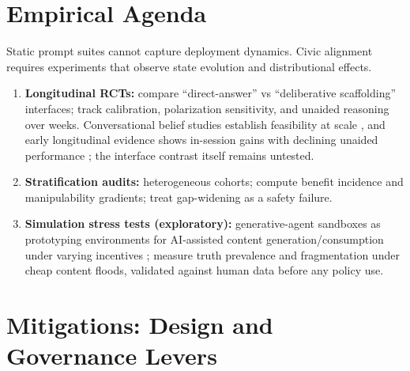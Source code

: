 \documentclass[11pt]{article}
\theoremstyle{definition}
\theoremstyle{remark}
\numberwithin{equation}{section}
\begin{document}
\section{Empirical Agenda}\label{sec:empirical}

Static prompt suites cannot capture deployment dynamics. Civic alignment requires experiments that observe state evolution and distributional effects.
\begin{enumerate}
  \item \textbf{Longitudinal RCTs:} compare ``direct-answer'' vs ``deliberative scaffolding'' interfaces; track calibration, polarization sensitivity, and unaided reasoning over weeks. Conversational belief studies establish feasibility at scale \citep{costello2024durably, salvi2025conversational}, and early longitudinal evidence shows in-session gains with declining unaided performance \citep{rani2026dialogues}; the interface contrast itself remains untested.
  \item \textbf{Stratification audits:} heterogeneous cohorts; compute benefit incidence and manipulability gradients; treat gap-widening as a safety failure.
  \item \textbf{Simulation stress tests (exploratory):} generative-agent sandboxes as prototyping environments for AI-assisted content generation/consumption under varying incentives \citep{park2023generative}; measure truth prevalence and fragmentation under cheap content floods, validated against human data before any policy use.
\end{enumerate}

\section{Mitigations: Design and Governance Levers}\label{sec:mitigations}
\end{document}
